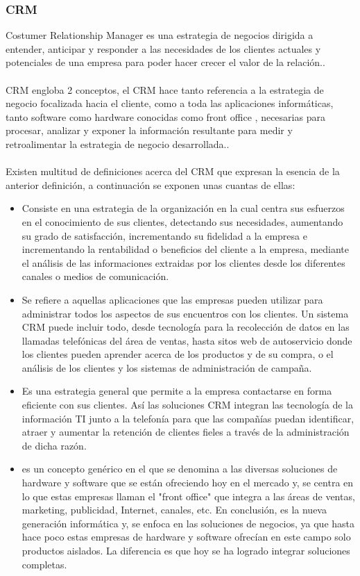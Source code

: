 \subsubsection{CRM} Costumer Relationship Manager es una estrategia de negocios dirigida a entender, anticipar y responder a las necesidades de los clientes actuales y potenciales de una empresa para poder hacer crecer el valor de la relaci\'on..%
\\%
\\%
CRM engloba 2 conceptos, el CRM hace tanto referencia a la estrategia de negocio focalizada hacia el cliente, como a toda las aplicaciones inform\'aticas, tanto software como hardware conocidas como front office , necesarias para procesar, analizar y exponer la informaci\'on resultante para medir y retroalimentar la estrategia de negocio desarrollada..%
\\%
\\%
Existen multitud de definiciones acerca del CRM que expresan la esencia de la anterior definici\'on, a continuaci\'on se exponen unas cuantas de ellas:%
\\%
\begin{itemize}
	\item Consiste en una estrategia de la organizaci\'on en la cual centra sus esfuerzos en el conocimiento de sus clientes, detectando sus necesidades, aumentando su grado de satisfacci\'on, incrementando su fidelidad a la empresa e incrementando la rentabilidad o beneficios del cliente a la empresa, mediante el an\'alisis de las informaciones extraidas por los clientes desde los diferentes canales o medios de comunicaci\'on.
	\item Se refiere a aquellas aplicaciones que las empresas pueden utilizar para administrar todos los aspectos de sus encuentros con los clientes. Un sistema CRM puede incluir todo, desde tecnolog\'ia para la recolecci\'on de datos en las llamadas telef\'onicas del \'area de ventas, hasta sitos web de autoservicio donde los clientes pueden aprender acerca de los productos y de su compra, o el an\'alisis de los clientes y los sistemas de administraci\'on de campa\~na.
	\item Es una estrategia general que permite a la empresa contactarse en forma eficiente con sus clientes. As\'i las soluciones CRM integran las tecnolog\'ia de la informaci\'on TI junto a la telefon\'ia para que las compa\~n\'ias puedan identificar, atraer y aumentar la retenci\'on de clientes fieles a trav\'es de la administraci\'on de dicha raz\'on.
	\item es un concepto gen\'erico en el que se denomina a las diversas soluciones de hardware y software que se est\'an ofreciendo hoy en el mercado y, se centra en lo que estas empresas llaman el "front office" que integra a las \'areas de ventas, marketing, publicidad, Internet, canales, etc. En conclusi\'on, es la nueva generaci\'on inform\'atica y, se enfoca en las soluciones de negocios, ya que hasta hace poco estas empresas de hardware y software ofrec\'ian en este campo solo productos aislados. La diferencia es que hoy se ha logrado integrar soluciones completas.
\end{itemize}

